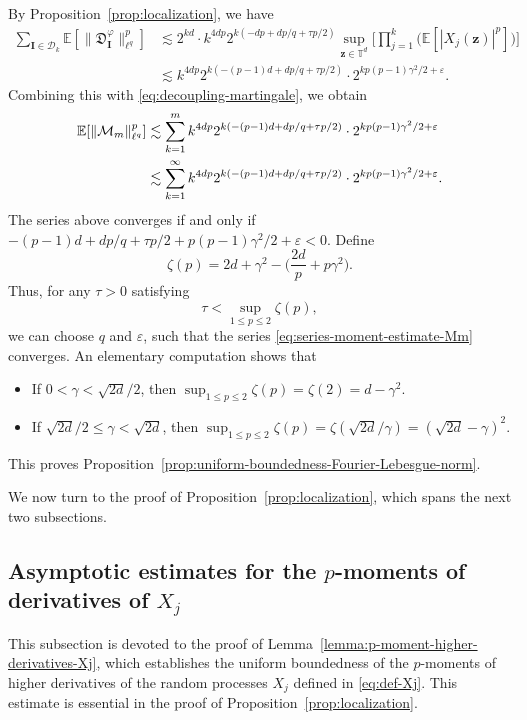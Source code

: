 \documentclass[12pt]{amsart}
\theoremstyle{definition}
\theoremstyle{remark}
\newcommand{\bz}{\boldsymbol{z}}
\newcommand{\E}{\mathbb{E}}
\newcommand{\T}{\mathbb{T}}
\numberwithin{equation}{section}
\begin{document}
By Proposition~\ref{prop:localization}, we have
\begin{align*}
\sum_{\boldsymbol{I}\in \mathscr{D}_k}\E[\|\mathfrak{D}_{\boldsymbol{I}}^\varphi\|_{\ell^q}^p]&\lesssim 2^{kd}\cdot k^{4dp} 2^{k(-dp+dp/q+\tau p/2)}\sup_{\bz\in \T^d}\bigg[\prod_{j=1}^k \big(\E[|X_j(\bz)|^p]\big)\bigg]\\
&\lesssim k^{4dp} 2^{k(-(p-1)d+dp/q+\tau p/2)}\cdot 2^{kp(p-1)\gamma^2/2+\varepsilon}.
\end{align*}
Combining this with \eqref{eq:decoupling-martingale}, we obtain
\begin{align}
\notag \E[\|\mathcal{M}_m\|_{\ell^q}^p]&\lesssim \sum_{k=1}^m k^{4dp} 2^{k(-(p-1)d+dp/q+\tau p/2)}\cdot 2^{kp(p-1)\gamma^2/2+\varepsilon}\\
&\lesssim \sum_{k=1}^\infty k^{4dp} 2^{k(-(p-1)d+dp/q+\tau p/2)}\cdot 2^{kp(p-1)\gamma^2/2+\varepsilon}. \label{eq:series-moment-estimate-Mm}
\end{align}
The series above converges if and only if $-(p-1)d+dp/q+\tau p/2+p(p-1)\gamma^2/2+\varepsilon<0$. Define 
\[
\zeta(p)=2d+\gamma^2-\bigg(\frac{2d}{p}+p\gamma^2\bigg).
\]
Thus, for any $\tau>0$ satisfying
\[
\tau<\sup_{1\le p\le 2}\zeta(p),
\]
we can choose $q$ and $\varepsilon$, such that the series \eqref{eq:series-moment-estimate-Mm} converges. An elementary computation shows that
\begin{itemize}
\item If $0<\gamma<\sqrt{2d}/2$, then $\sup_{1\le p\le 2}\zeta(p)=\zeta(2)=d-\gamma^2$.
\item If $\sqrt{2d}/2\le \gamma<\sqrt{2d}$, then $\sup_{1\le p\le 2}\zeta(p)=\zeta(\sqrt{2d}/\gamma)=(\sqrt{2d}-\gamma)^2$.
\end{itemize}
This proves Proposition~\ref{prop:uniform-boundedness-Fourier-Lebesgue-norm}.

We now turn to the proof of Proposition~\ref{prop:localization}, which spans the next two subsections.


\subsection{Asymptotic estimates for the $p$-moments of derivatives of $X_j$}

This subsection is devoted to the proof of Lemma~\ref{lemma:p-moment-higher-derivatives-Xj}, which establishes the uniform boundedness of the $p$-moments of higher derivatives of the random processes $X_j$ defined in \eqref{eq:def-Xj}. This estimate is essential in the proof of Proposition~\ref{prop:localization}.
\end{document}
